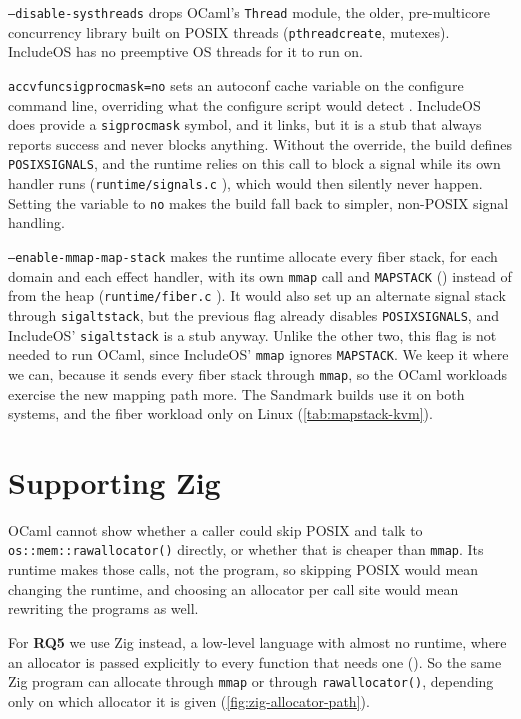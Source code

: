 \documentclass[12pt]{report}
\newcommand{\fullref}[1]{\Cref{#1}}
\renewcommand{\_}{\origunderscore\allowbreak}
\begin{document}
\texttt{--disable-systhreads} drops OCaml's \texttt{Thread} module, the older, pre-multicore concurrency library built on POSIX threads (\texttt{pthread\_create}, mutexes). IncludeOS has no preemptive OS threads for it to run on.

\texttt{ac\_cv\_func\_sigprocmask=no} sets an autoconf cache variable on the configure command line, overriding what the configure script would detect \cite{fsf2012autoconf}. IncludeOS does provide a \texttt{sigprocmask} symbol, and it links, but it is a stub that always reports success and never blocks anything. Without the override, the build defines \texttt{POSIX\_SIGNALS}, and the runtime relies on this call to block a signal while its own handler runs (\texttt{runtime/signals.c} \cite{ocaml2025source}), which would then silently never happen. Setting the variable to \texttt{no} makes the build fall back to simpler, non-POSIX signal handling.

\texttt{--enable-mmap-map-stack} makes the runtime allocate every fiber stack, for each domain and each effect handler, with its own \texttt{mmap} call and \texttt{MAP\_STACK} (\fullref{sec:posix}) instead of from the heap (\texttt{runtime/fiber.c} \cite{ocaml2025source}). It would also set up an alternate signal stack through \texttt{sigaltstack}, but the previous flag already disables \texttt{POSIX\_SIGNALS}, and IncludeOS' \texttt{sigaltstack} is a stub anyway. Unlike the other two, this flag is not needed to run OCaml, since IncludeOS' \texttt{mmap} ignores \texttt{MAP\_STACK}. We keep it where we can, because it sends every fiber stack through \texttt{mmap}, so the OCaml workloads exercise the new mapping path more. The Sandmark builds use it on both systems, and the fiber workload only on Linux (\cref{tab:mapstack-kvm}).

\section{Supporting Zig}
\label{sec:design-zig}

OCaml cannot show whether a caller could skip POSIX and talk to \texttt{os::mem::raw\_allocator()} directly, or whether that is cheaper than \texttt{mmap}. Its runtime makes those calls, not the program, so skipping POSIX would mean changing the runtime, and choosing an allocator per call site would mean rewriting the programs as well.

For \textbf{RQ5} we use Zig instead, a low-level language with almost no runtime, where an allocator is passed explicitly to every function that needs one (\fullref{sec:bg-languages}). So the same Zig program can allocate through \texttt{mmap} or through \texttt{raw\_allocator()}, depending only on which allocator it is given (\cref{fig:zig-allocator-path}).
\end{document}
